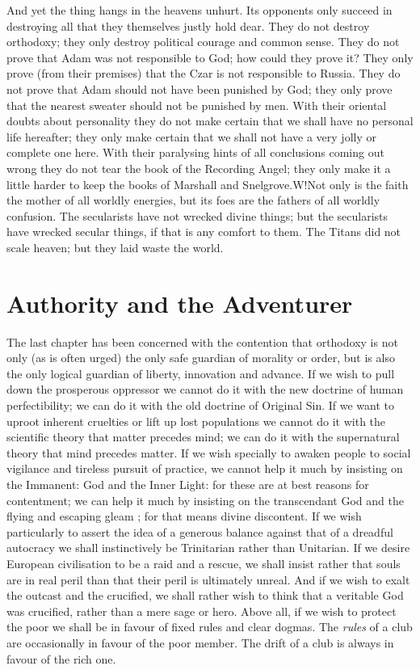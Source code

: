 \documentclass{book}
\begin{document}
And yet the thing hangs in the heavens unhurt. Its opponents only succeed in destroying all that they themselves justly hold dear. They do not destroy orthodoxy; they only destroy political courage and common sense. They do not prove that Adam was not responsible to God; how could they prove it? They only prove (from their premises) that the Czar is not responsible to Russia. They do not prove that Adam should not have been punished by God; they only prove that the nearest sweater should not be punished by men. With their oriental doubts about personality they do not make certain that we shall have no personal life hereafter; they only make certain that we shall not have a very jolly or complete one here. With their paralysing hints of all conclusions coming out wrong they do not tear the book of the Recording Angel; they only make it a little harder to keep the books of Marshall and Snelgrove.W!Not only is the faith the mother of all worldly energies, but its foes are the fathers of all worldly confusion. The secularists have not wrecked divine things; but the secularists have wrecked secular things, if that is any comfort to them. The Titans did not scale heaven; but they laid waste the world.

\chapter{Authority and the Adventurer}
\label{chapter-8}
The last chapter has been concerned with the contention that orthodoxy is not only (as is often urged) the only safe guardian of morality or order, but is also the only logical guardian of liberty, innovation and advance. If we wish to pull down the prosperous oppressor we cannot do it with the new doctrine of human perfectibility; we can do it with the old doctrine of Original Sin. If we want to uproot inherent cruelties or lift up lost populations we cannot do it with the scientific theory that matter precedes mind; we can do it with the supernatural theory that mind precedes matter. If we wish specially to awaken people to social vigilance and tireless pursuit of practice, we cannot help it much by insisting on the Immanent: God and the Inner Light: for these are at best reasons for contentment; we can help it much by insisting on the transcendant God and the flying and escaping gleam ; for that means divine discontent. If we wish particularly to assert the idea of a generous balance against that of a dreadful autocracy we shall instinctively be Trinitarian rather than Unitarian. If we desire European civilisation to be a raid and a rescue, we shall insist rather that souls are in real peril than that their peril is ultimately unreal. And if we wish to exalt the outcast and the crucified, we shall rather wish to think that a veritable God was crucified, rather than a mere sage or hero. Above all, if we wish to protect the poor we shall be in favour of fixed rules and clear dogmas. The \emph{rules} of a club are occasionally in favour of the poor member. The drift of a club is always in favour of the rich one.
\end{document}
